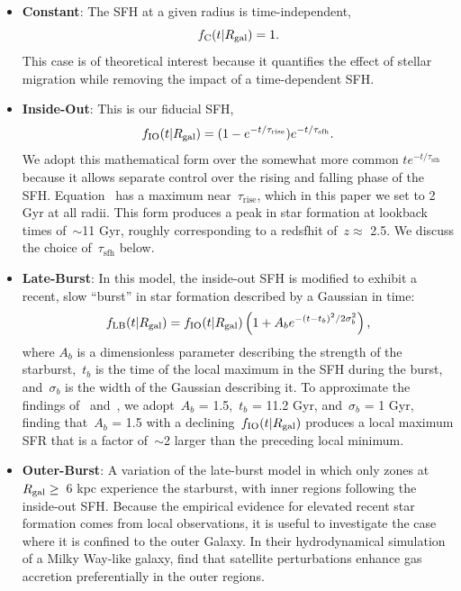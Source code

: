 \documentclass[draft2.tex]{subfiles}
\begin{document}
\begin{itemize} 
	\item \textbf{Constant}: The SFH at a given radius is time-independent, 
	\begin{equation} 
	f_\text{C}(t|R_\text{gal}) = 1. 
	\label{eq:constant_sfh} 
	\end{equation} 
	This case is of theoretical interest because it quantifies the effect of 
	stellar migration while removing the impact of a time-dependent SFH. 

	\item \textbf{Inside-Out}: This is our fiducial SFH, 
	\begin{equation} 
	f_\text{IO}(t|R_\text{gal}) = (1 - e^{-t / \tau_\text{rise}}) 
	e^{-t / \tau_\text{sfh}}. 
	\label{eq:insideout_sfh} 
	\end{equation} 
	We adopt this mathematical form over the somewhat more common 
	$te^{-t/\tau_\text{sfh}}$ because it allows separate control over the 
	rising and falling phase of the SFH. 
	Equation~ has a maximum near~$\tau_\text{rise}$, 
	which in this paper we set to 2 Gyr at all radii. 
	This form produces a peak in star formation at lookback times of~$\sim$11 
	Gyr, roughly corresponding to a redsfhit of~$z \approx$ 2.5. 
	We discuss the choice of~$\tau_\text{sfh}$ below. 

	\item \textbf{Late-Burst}: In this model, the inside-out SFH is modified to 
	exhibit a recent, slow ``burst'' in star formation described by a Gaussian 
	in time: 
	\begin{equation} 
	f_\text{LB}(t|R_\text{gal}) = f_\text{IO}(t|R_\text{gal}) 
	\left(1 + A_be^{-(t - t_b)^2/2\sigma_b^2}\right), 
	\label{eq:lateburst_sfh} 
	\end{equation} 
	where $A_b$ is a dimensionless parameter describing the strength of the 
	starburst,~$t_b$ is the time of the local maximum in the SFH during the 
	burst, and~$\sigma_b$ is the width of the Gaussian describing it. 
	To approximate the findings of~\citet{Mor2019} and~\citet{Isern2019}, we 
	adopt~$A_b$ = 1.5,~$t_b$ = 11.2 Gyr, and~$\sigma_b$ = 1 Gyr, finding 
	that~$A_b$ = 1.5 with a declining~$f_\text{IO}(t|R_\text{gal})$ produces a local 
	maximum SFR that is a factor of~$\sim$2 larger than the preceding local 
	minimum. 

	\item \textbf{Outer-Burst}: A variation of the late-burst model in which 
	only zones at~$R_\text{gal} \geq$~6 kpc experience the starburst, with inner 
	regions following the inside-out SFH. 
	Because the empirical evidence for elevated recent star formation comes 
	from local observations, it is useful to investigate the case where it is 
	confined to the outer Galaxy. 
	In their hydrodynamical simulation of a Milky Way-like galaxy, 
	\citet{Vincenzo2020} find that satellite perturbations enhance gas 
	accretion preferentially in the outer regions. 
\end{itemize} 
\end{document}
